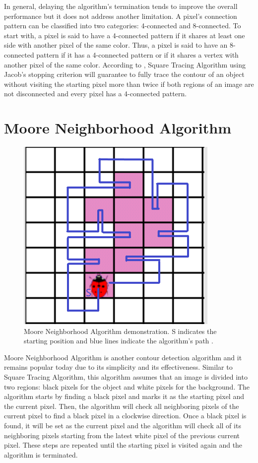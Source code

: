 \documentclass[conference]{IEEEtran}
\begin{document}
In general, delaying the algorithm's termination tends to improve the overall performance but it does not address another limitation. A pixel's connection pattern can be classified into two categories: 4-connected and 8-connected. To start with, a pixel is said to have a 4-connected pattern if it shares at least one side with another pixel of the same color. Thus, a pixel is said to have an 8-connected pattern if it has a 4-connected pattern or if it shares a vertex with another pixel of the same color. According to \cite{sta:2000}, Square Tracing Algorithm using Jacob's stopping criterion will guarantee to fully trace the contour of an object without visiting the starting pixel more than twice if both regions of an image are not disconnected and every pixel has a 4-connected pattern.

\section{Moore Neighborhood Algorithm}

\begin{figure}[!htb]
    \centering
    \includegraphics[scale = 0.5]{fig4.png}
    \caption{Moore Neighborhood Algorithm demonstration. S indicates the starting position and blue lines indicate the algorithm's path \cite{mnt:2000}.}
\end{figure}

Moore Neighborhood Algorithm is another contour detection algorithm and it remains popular today due to its simplicity and its effectiveness. Similar to Square Tracing Algorithm, this algorithm assumes that an image is divided into two regions: black pixels for the object and white pixels for the background. The algorithm starts by finding a black pixel and marks it as the starting pixel and the current pixel. Then, the algorithm will check all neighboring pixels of the current pixel to find a black pixel in a clockwise direction. Once a black pixel is found, it will be set as the current pixel and the algorithm will check all of its neighboring pixels starting from the latest white pixel of the previous current pixel. These steps are repeated until the starting pixel is visited again and the algorithm is terminated.
\end{document}
